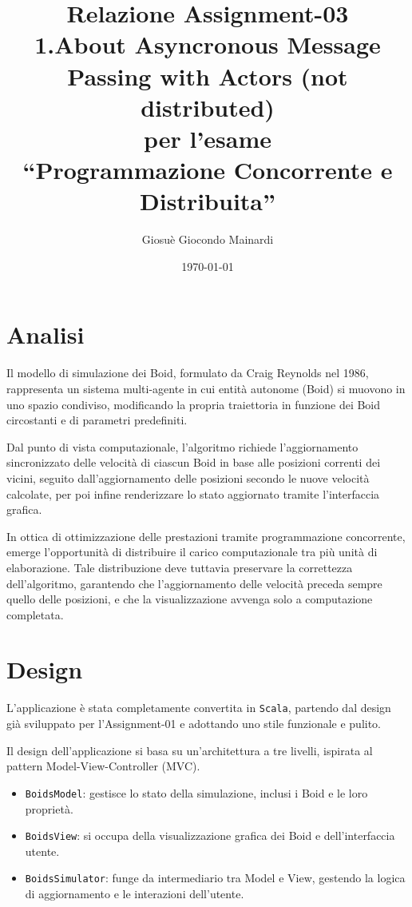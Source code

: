 \documentclass[a4paper,12pt]{report}
\title{Relazione Assignment-03 \\
1.About Asyncronous Message Passing with Actors (not distributed)\\ per l'esame \\ ``Programmazione Concorrente e Distribuita''}
\author{Giosuè Giocondo Mainardi}
\date{\today}
\begin{document}
\maketitle

\tableofcontents

\chapter{Analisi}
    Il modello di simulazione dei Boid, formulato da Craig Reynolds nel 1986, rappresenta un sistema multi-agente in cui 
    entità autonome (Boid) si muovono in uno spazio condiviso, modificando la propria traiettoria in funzione dei Boid 
    circostanti e di parametri predefiniti.
    
    Dal punto di vista computazionale, l'algoritmo richiede l'aggiornamento sincronizzato delle velocità di ciascun Boid 
    in base alle posizioni correnti dei vicini, seguito dall'aggiornamento delle posizioni secondo le nuove velocità 
    calcolate, per poi infine renderizzare lo stato aggiornato tramite l'interfaccia grafica.
    
    In ottica di ottimizzazione delle prestazioni tramite programmazione concorrente, emerge l'opportunità di distribuire 
    il carico computazionale tra più unità di elaborazione. Tale distribuzione deve tuttavia preservare la correttezza 
    dell'algoritmo, garantendo che l'aggiornamento delle velocità preceda sempre quello delle posizioni, e che la 
    visualizzazione avvenga solo a computazione completata.


\chapter{Design}

    L'applicazione è stata completamente convertita in \texttt{Scala}, partendo dal design già sviluppato per l'Assignment-01 e adottando uno stile funzionale e pulito.

    Il design dell'applicazione si basa su un'architettura a tre livelli, ispirata al pattern Model-View-Controller (MVC).
    \begin{itemize}
        \item \texttt{BoidsModel}: gestisce lo stato della simulazione, inclusi i Boid e le loro proprietà.
        \item \texttt{BoidsView}: si occupa della visualizzazione grafica dei Boid e dell'interfaccia utente.
        \item \texttt{BoidsSimulator}: funge da intermediario tra Model e View, gestendo la logica di aggiornamento e le interazioni dell'utente.
    \end{itemize}
\end{document}
